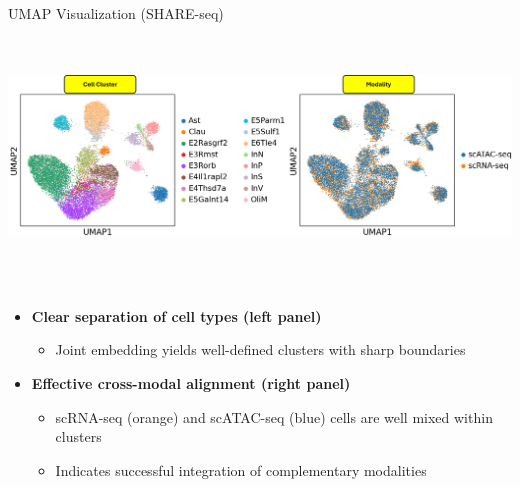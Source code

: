 \documentclass{beamer}
\begin{document}
\begin{frame}{UMAP Visualization (SHARE-seq)}
\vspace{0.1cm}
\centering
\includegraphics[width=1.0\textwidth,height=7cm,keepaspectratio]{./sxSNF_figure/Fig5.jpg}

\vspace{0.1cm}

\begin{center}
\begin{itemize}
  \item \textbf{Clear separation of cell types (left panel)}  
  \begin{itemize}\footnotesize
      \item Joint embedding yields well-defined clusters with sharp boundaries
  \end{itemize}

  \item \textbf{Effective cross-modal alignment (right panel)}  
  \begin{itemize}\footnotesize
      \item scRNA-seq (orange) and scATAC-seq (blue) cells are well mixed within clusters  
      \item Indicates successful integration of complementary modalities
  \end{itemize}
\end{itemize}
\end{center}

\end{frame}
\end{document}
